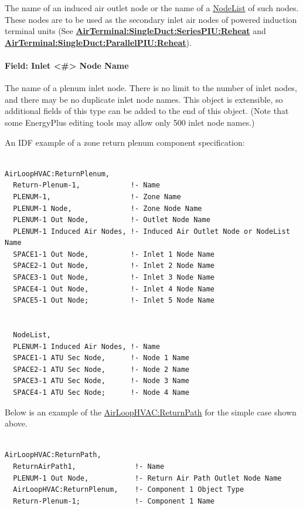 The name of an induced air outlet node or the name of a \hyperref[nodelist]{NodeList} of such nodes. These nodes are to be used as the secondary inlet air nodes of powered induction terminal units (See \textbf{\hyperref[airterminalsingleductseriespiureheat]{AirTerminal:SingleDuct:SeriesPIU:Reheat}} and \textbf{\hyperref[airterminalsingleductparallelpiureheat]{AirTerminal:SingleDuct:ParallelPIU:Reheat}}).

\paragraph{Field: Inlet \textless{}\#\textgreater{} Node Name}\label{field-inlet-node-name}

The name of a plenum inlet node. There is no limit to the number of inlet nodes, and there may be no duplicate inlet node names.  This object is extensible, so additional fields of this type can be added to the end of this object.  (Note that some EnergyPlus editing tools may allow only 500 inlet node names.)

An IDF example of a zone return plenum component specification:

\begin{lstlisting}

AirLoopHVAC:ReturnPlenum,
  Return-Plenum-1,            !- Name
  PLENUM-1,                   !- Zone Name
  PLENUM-1 Node,              !- Zone Node Name
  PLENUM-1 Out Node,          !- Outlet Node Name
  PLENUM-1 Induced Air Nodes, !- Induced Air Outlet Node or NodeList Name
  SPACE1-1 Out Node,          !- Inlet 1 Node Name
  SPACE2-1 Out Node,          !- Inlet 2 Node Name
  SPACE3-1 Out Node,          !- Inlet 3 Node Name
  SPACE4-1 Out Node,          !- Inlet 4 Node Name
  SPACE5-1 Out Node;          !- Inlet 5 Node Name


  NodeList,
  PLENUM-1 Induced Air Nodes, !- Name
  SPACE1-1 ATU Sec Node,      !- Node 1 Name
  SPACE2-1 ATU Sec Node,      !- Node 2 Name
  SPACE3-1 ATU Sec Node,      !- Node 3 Name
  SPACE4-1 ATU Sec Node;      !- Node 4 Name
\end{lstlisting}

Below is an example of the \hyperref[airloophvacreturnpath]{AirLoopHVAC:ReturnPath} for the simple case shown above.

\begin{lstlisting}

AirLoopHVAC:ReturnPath,
  ReturnAirPath1,              !- Name
  PLENUM-1 Out Node,           !- Return Air Path Outlet Node Name
  AirLoopHVAC:ReturnPlenum,    !- Component 1 Object Type
  Return-Plenum-1;             !- Component 1 Name
\end{lstlisting}

